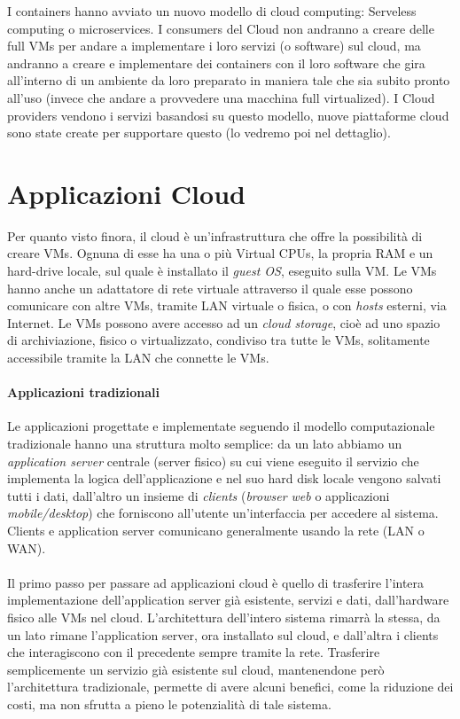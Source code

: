 \documentclass{article}
\begin{document}
I containers hanno avviato un nuovo modello di cloud computing: Serveless computing o microservices. I consumers del Cloud non andranno a creare delle full VMs per andare a implementare i loro servizi (o software) sul cloud, ma andranno a creare e implementare dei containers con il loro software che gira all'interno di un ambiente da loro preparato in maniera tale che sia subito pronto all'uso (invece che andare a provvedere una macchina full virtualized). I Cloud providers vendono i servizi basandosi su questo modello, nuove piattaforme cloud sono state create per supportare questo (lo vedremo poi nel dettaglio).

\newpage
\section{Applicazioni Cloud}
Per quanto visto finora, il cloud è un’infrastruttura che offre la possibilità di creare VMs. Ognuna di esse ha una o più Virtual CPUs, la propria RAM e un hard-drive locale, sul quale è installato il \textit{guest OS}, eseguito sulla VM. 
Le VMs hanno anche un adattatore di rete virtuale attraverso il quale esse possono comunicare con altre VMs, tramite LAN virtuale o fisica, o con \textit{hosts} esterni, via Internet.
Le VMs possono avere accesso ad un \textit{cloud storage}, cioè ad uno spazio di archiviazione, fisico o virtualizzato, condiviso tra tutte le VMs, solitamente accessibile tramite la LAN che connette le VMs.

\paragraph{Applicazioni tradizionali}
Le applicazioni progettate e implementate seguendo il modello computazionale tradizionale hanno una struttura molto semplice: da un lato abbiamo un \textit{application server} centrale (server fisico) su cui viene eseguito il servizio che implementa la logica dell’applicazione e nel suo hard disk locale vengono salvati tutti i dati, dall’altro un insieme di \textit{clients} (\textit{browser web} o applicazioni \textit{mobile/desktop}) che forniscono all’utente un’interfaccia per accedere al sistema. Clients e application server comunicano generalmente usando la rete (LAN o WAN). \\ \\Il primo passo per passare ad applicazioni cloud è quello di trasferire l’intera implementazione dell’application server già esistente, servizi e dati, dall’hardware fisico alle VMs nel cloud.
L’architettura dell’intero sistema rimarrà la stessa, da un lato rimane l’application server, ora installato sul cloud, e dall’altra i clients che interagiscono con il precedente sempre tramite la rete.
Trasferire semplicemente un servizio già esistente sul cloud, mantenendone però l’architettura tradizionale, permette di avere alcuni benefici, come la riduzione dei costi, ma non sfrutta a pieno le potenzialità di tale sistema.
\end{document}
